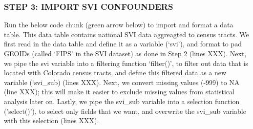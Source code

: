 \documentclass[
  12pt,
]{article}
\newenvironment{Shaded}{\begin{snugshade}}{\end{snugshade}}
\newcommand{\AttributeTok}[1]{\textcolor[rgb]{0.13,0.29,0.53}{#1}}
\newcommand{\CommentTok}[1]{\textcolor[rgb]{0.56,0.35,0.01}{\textit{#1}}}
\newcommand{\ConstantTok}[1]{\textcolor[rgb]{0.56,0.35,0.01}{#1}}
\newcommand{\DecValTok}[1]{\textcolor[rgb]{0.00,0.00,0.81}{#1}}
\newcommand{\FunctionTok}[1]{\textcolor[rgb]{0.13,0.29,0.53}{\textbf{#1}}}
\newcommand{\NormalTok}[1]{#1}
\newcommand{\OtherTok}[1]{\textcolor[rgb]{0.56,0.35,0.01}{#1}}
\newcommand{\SpecialCharTok}[1]{\textcolor[rgb]{0.81,0.36,0.00}{\textbf{#1}}}
\newcommand{\StringTok}[1]{\textcolor[rgb]{0.31,0.60,0.02}{#1}}
\begin{document}
\hypertarget{step-3-import-svi-confounders}{%
\subsubsection{STEP 3: IMPORT SVI
CONFOUNDERS}\label{step-3-import-svi-confounders}}

Run the below code chunk (green arrow below) to import and format a data
table. This data table contains national SVI data aggreagted to census
tracts. We first read in the data table and define it as a variable
(`svi'), and format to pad GEOIDs (called `FIPS' in the SVI dataset) as
done in Step 2 (lines XXX). Next, we pipe the svi variable into a
filtering function `filter()', to filter out data that is located with
Colorado census tracts, and define this filtered data as a new variable
(`svi\_sub) (lines XXX). Next, we convert missing values (-999) to NA
(line XXX); this will make it easier to exclude missing values from
statistical analysis later on. Lastly, we pipe the svi\_sub variable
into a selection function ('select()'), to select only fields that we
want, and overwrite the svi\_sub variable with this selection (lines
XXX).

\begin{Shaded}
\end{Shaded}
\end{document}
